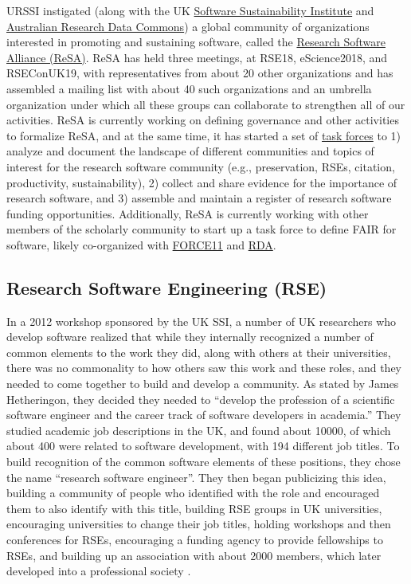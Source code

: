 \documentclass[
]{book}
\begin{document}
URSSI instigated (along with the UK \href{https://software.ac.uk}{Software Sustainability Institute}
and \href{https://ardc.edu.au}{Australian Research Data Commons}) a global community
of organizations interested in promoting and sustaining software, called the
\href{http://www.researchsoft.org}{Research Software Alliance (ReSA)}. ReSA has
held three meetings, at RSE18, eScience2018, and RSEConUK19, with representatives
from about 20 other organizations and has assembled a mailing list with about 40
such organizations and an umbrella organization under which all these groups can
collaborate to strengthen all of our activities. ReSA is currently working on
defining governance and other activities to formalize ReSA, and at the same time,
it has started a set of \href{http://www.researchsoft.org/resa-taskforces-join-us/}{task forces}
to 1) analyze and document the landscape of different communities and topics of
interest for the research software community (e.g., preservation, RSEs, citation,
productivity, sustainability), 2) collect and share evidence for the importance of
research software, and 3) assemble and maintain a register of research software
funding opportunities. Additionally, ReSA is currently working with other members
of the scholarly community to start up a task force to define FAIR for software,
likely co-organized with \href{https://www.force11.org/}{FORCE11} and
\href{https://www.rd-alliance.org/}{RDA}.

\hypertarget{research-software-engineering-rse}{%
\subsection{Research Software Engineering (RSE)}\label{research-software-engineering-rse}}

In a 2012 workshop sponsored by the UK SSI, a number of UK researchers who develop
software realized that while they internally recognized a number of common elements
to the work they did, along with others at their universities, there was no
commonality to how others saw this work and these roles, and they needed to come
together to build and develop a community. As stated by James Hetheringon, they
decided they needed to ``develop the profession of a scientific software engineer
and the career track of software developers in academia.'' They studied academic job
descriptions in the UK, and found about 10000, of which about 400 were related to
software development, with 194 different job titles. To build recognition of the
common software elements of these positions, they chose the name ``research software
engineer''. They then began publicizing this idea, building a community of people who
identified with the role and encouraged them to also identify with this title,
building RSE groups in UK universities, encouraging universities to change their
job titles, holding workshops and then conferences for RSEs, encouraging a funding
agency to provide fellowships to RSEs, and building up an association with about
2000 members, which later developed into a professional society \citep{RSEHettrick}.
\end{document}

